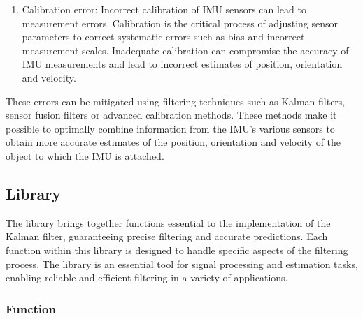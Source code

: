 \begin{enumerate}
	\item Calibration error: Incorrect calibration of IMU sensors can lead to measurement errors. Calibration is the critical process of adjusting sensor parameters to correct systematic errors such as bias and incorrect measurement scales. Inadequate calibration can compromise the accuracy of IMU measurements and lead to incorrect estimates of position, orientation and velocity. \cite{researchgate_calibration:2025}
	
\end{enumerate}

These errors can be mitigated using filtering techniques such as Kalman filters, sensor fusion filters or advanced calibration methods. These methods make it possible to optimally combine information from the IMU's various sensors to obtain more accurate estimates of the position, orientation and velocity of the object to which the IMU is attached. \cite{pmc_kalman_filter:2025}


\subsection{Library }

The  library brings together functions essential to the implementation of the Kalman filter, guaranteeing precise filtering and accurate predictions. Each function within this library is designed to handle specific aspects of the filtering process. The library   is an essential tool for signal processing and estimation tasks, enabling reliable and efficient filtering in a variety of applications.  \cite{arduino_kalman:2024}



\subsubsection{Function}

